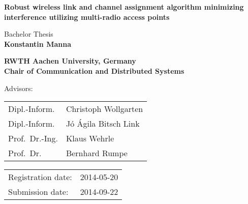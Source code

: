 \titlehead{
	\centering
	\texttt{[image: logos/comsys-text]}
	\hfill
	\texttt{[image: logos/rwth]}
} %

\begin{titlepage}

\let\footnotesize\small \let\footnoterule\relax

\hbox{}
\vfill

\centering

\begin{doublespace}
{ \huge\textbf{\textsf{Robust wireless link and channel assignment algorithm
minimizing interference utilizing multi-radio access points 
}}}
\end{doublespace}
\vskip 2cm

{\large Bachelor Thesis\\[5pt]}
{\large \textbf{Konstantin Manna}}
\vskip 1cm

\textbf{RWTH Aachen University, Germany\\[5pt]
        Chair of Communication and Distributed Systems}
\vskip 2cm

\large

Advisors:
\vskip 2mm

\begin{tabular}{R{7cm}p{7cm}}
Dipl.-Inform. & Christoph Wollgarten\\
Dipl.-Inform. & J\'o \'Agila Bitsch Link\\
Prof.~Dr.-Ing. & Klaus Wehrle\\
Prof.~Dr. & Bernhard Rumpe
\end{tabular}
\vskip 1cm

\begin{tabular}{R{6cm}p{6cm}}
Registration date:  & 2014-05-20 \\
Submission date:    & 2014-09-22 \\
\end{tabular}

\vfill

\end{titlepage}

